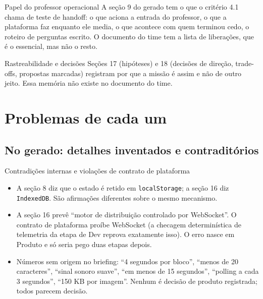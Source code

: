 \documentclass[11pt,a4paper]{article}
\newcommand{\arq}[1]{\texttt{\small #1}}
\begin{document}
\begin{creditobox}{Papel do professor operacional}
A seção 9 do gerado tem o que o critério 4.1 chama de teste de handoff: o que aciona a entrada do professor, o que a plataforma faz enquanto ele media, o que acontece com quem terminou cedo, o roteiro de perguntas escrito. O documento do time tem a lista de liberações, que é o essencial, mas não o resto.
\end{creditobox}

\begin{creditobox}{Rastreabilidade e decisões}
Seções 17 (hipóteses) e 18 (decisões de direção, trade-offs, propostas marcadas) registram por que a missão é assim e não de outro jeito. Essa memória não existe no documento do time.
\end{creditobox}

\section{Problemas de cada um}

\subsection{No gerado: detalhes inventados e contraditórios}

\begin{achadobox}{Contradições internas e violações de contrato de plataforma}
\begin{itemize}
\item A seção 8 diz que o estado é retido em \arq{localStorage}; a seção 16 diz \arq{IndexedDB}. São afirmações diferentes sobre o mesmo mecanismo.
\item A seção 16 prevê ``motor de distribuição controlado por WebSocket''. O contrato de plataforma proíbe WebSocket (a checagem determinística de telemetria da etapa de Dev reprova exatamente isso). O erro nasce em Produto e só seria pego duas etapas depois.
\item Números sem origem no briefing: ``4 segundos por bloco'', ``menos de 20 caracteres'', ``sinal sonoro suave'', ``em menos de 15 segundos'', ``polling a cada 3 segundos'', ``150 KB por imagem''. Nenhum é decisão de produto registrada; todos parecem decisão.
\end{itemize}
\end{achadobox}
\end{document}
